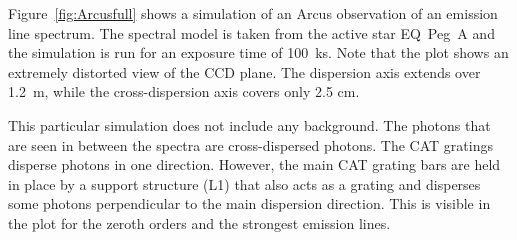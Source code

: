 \documentclass[linenumbers]{aastex631}
\begin{document}
Figure~\ref{fig:Arcusfull} shows a simulation of an Arcus observation of an emission line spectrum. The spectral model is taken from the active star EQ~Peg~A \citep{2008A&A...491..859L} and the simulation is run for an exposure time of 100~ks. Note that the plot shows an extremely distorted view of the CCD plane. The dispersion axis extends over 1.2~m, while the cross-dispersion axis covers only 2.5 cm.

This particular simulation does not include any background. The photons that are seen in between the spectra are cross-dispersed photons. The CAT gratings disperse photons in one direction. However, the main CAT grating bars are held in place by a support structure (L1) that also acts as a grating and disperses some photons perpendicular to the main dispersion direction. This is visible in the plot for the zeroth orders and the strongest emission lines.







\end{document}
